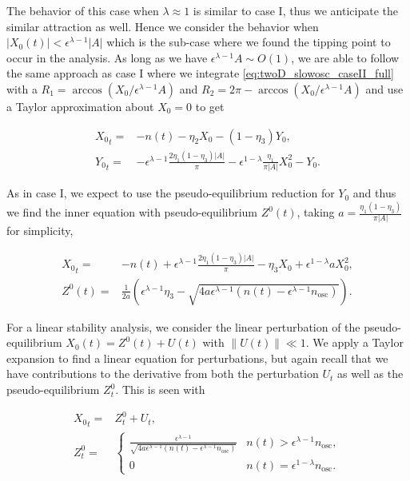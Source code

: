 The behavior of this case when $\lambda\approx 1$ is similar to case I, thus we anticipate the similar attraction as well. Hence we consider the behavior when $|X_0(t)|<\epsilon^{\lambda-1}|A|$ which is the sub-case where we found the tipping point to occur in the analysis. As long as we have $\epsilon^{\lambda-1}A\sim O(1)$, we are able to follow the same approach as case I where we integrate \eqref{eq:twoD_slowosc_caseII_full} with a $R_1=\arccos(X_0/\epsilon^{\lambda-1}A)$ and $R_2=2\pi-\arccos(X_0/\epsilon^{\lambda-1}A)$ and use a Taylor approximation about $X_0=0$ to get

\begin{equation*}
\begin{aligned}
{X_0}_t =& - n(t)-\eta_2 X_0 -(1-\eta_3)Y_0,\\
{Y_0}_t =& -\epsilon^{\lambda-1}\frac{2\eta_1(1-\eta_3)|A|}{\pi}-\epsilon^{1-\lambda}\frac{\eta_1}{\pi|A|}X_0^2- Y_0.
\end{aligned}
\end{equation*}

\indent As in case I, we expect to use the pseudo-equilibrium reduction for $Y_0$ and thus we find the inner equation with pseudo-equilibrium $Z^0(t)$, taking $a=\frac{\eta_1(1-\eta_3)}{\pi|A|}$ for simplicity,

\begin{equation*}
\begin{aligned}
{X_0}_t =& -n(t)+\epsilon^{\lambda-1}\frac{2\eta_1(1-\eta_3)|A|}{\pi}-\eta_3 X_0+\epsilon^{1-\lambda}aX_0^2,\\
Z^0(t) =& \frac{1}{2a}\left(\epsilon^{\lambda-1}\eta_3-\sqrt{4a\epsilon^{\lambda-1}(n(t)-\epsilon^{\lambda-1}n_{\text{osc}})}\right).
\end{aligned}
\end{equation*}

For a linear stability analysis, we consider the linear perturbation of the pseudo-equilibrium $X_0(t)= Z^0(t)+U(t)$ with $\lVert U(t)\rVert \ll 1$. We apply a Taylor expansion to find a linear equation for perturbations, but again recall that we have contributions to the derivative from both the perturbation $U_t$ as well as the pseudo-equilibrium $Z^0_t$. This is seen with

\begin{equation}
\begin{aligned}
{X_0}_t =& Z^0_t+U_t,\\
Z^0_t=&\begin{cases}
\frac{\epsilon^{\lambda-1}}{\sqrt{4a\epsilon^{\lambda-1}(n(t)-\epsilon^{\lambda-1}n_{\text{osc}})}} & n(t)>\epsilon^{\lambda-1}n_{\text{osc}},\\
0 & n(t)=\epsilon^{1-\lambda}n_{\text{osc}}.
\end{cases}
\end{aligned}
\end{equation}

